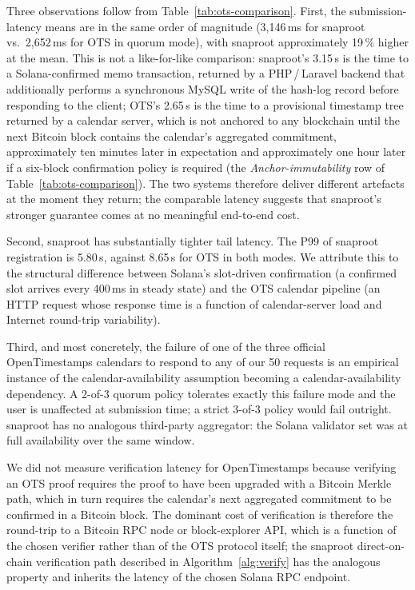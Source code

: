 \documentclass[11pt,a4paper]{article}
\begin{document}
Three observations follow from Table~\ref{tab:ots-comparison}. First,
the submission-latency means are in the same order of magnitude
(3{,}146\,ms for snaproot vs.\ 2{,}652\,ms for OTS in quorum mode),
with snaproot approximately 19\,\% higher at the mean. This is not a
like-for-like comparison: snaproot's 3.15\,s is the time to a
Solana-confirmed memo transaction, returned by a PHP\,/\,Laravel
backend that additionally performs a synchronous MySQL write of the
hash-log record before responding to the client; OTS's 2.65\,s is the
time to a provisional timestamp tree returned by a calendar server,
which is not anchored to any blockchain until the next Bitcoin block
contains the calendar's aggregated commitment, approximately ten
minutes later in expectation and approximately one hour later if a
six-block confirmation policy is required (the
\textit{Anchor-immutability} row of
Table~\ref{tab:ots-comparison}). The two systems therefore deliver
different artefacts at the moment they return; the comparable latency
suggests that snaproot's stronger guarantee comes at no meaningful
end-to-end cost.

Second, snaproot has substantially tighter tail latency. The P99 of
snaproot registration is 5.80\,s, against 8.65\,s for OTS in both
modes. We attribute this to the structural difference between Solana's
slot-driven confirmation (a confirmed slot arrives every 400\,ms in
steady state) and the OTS calendar pipeline (an HTTP request whose
response time is a function of calendar-server load and Internet
round-trip variability).

Third, and most concretely, the failure of one of the three official
OpenTimestamps calendars to respond to any of our 50 requests is an
empirical instance of the calendar-availability assumption becoming a
calendar-availability dependency. A 2-of-3 quorum policy tolerates
exactly this failure mode and the user is unaffected at submission
time; a strict 3-of-3 policy would fail outright. snaproot has no
analogous third-party aggregator: the Solana validator set was at full
availability over the same window.

We did not measure verification latency for OpenTimestamps because
verifying an OTS proof requires the proof to have been upgraded with a
Bitcoin Merkle path, which in turn requires the calendar's next
aggregated commitment to be confirmed in a Bitcoin block. The dominant
cost of verification is therefore the round-trip to a Bitcoin RPC node
or block-explorer API, which is a function of the chosen verifier
rather than of the OTS protocol itself; the snaproot direct-on-chain
verification path described in Algorithm~\ref{alg:verify} has the
analogous property and inherits the latency of the chosen Solana RPC
endpoint.
\end{document}
